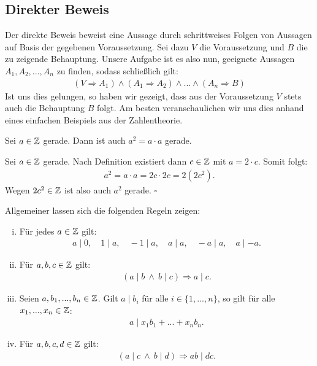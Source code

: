 \subsection{Direkter Beweis}
Der direkte Beweis beweist eine Aussage durch schrittweises Folgen von Aussagen auf Basis der gegebenen Voraussetzung. 
Sei dazu $V$ die Voraussetzung und $B$ die zu zeigende Behauptung. Unsere Aufgabe ist es also nun, geeignete Aussagen $A_1, A_2,...,A_n$ zu finden, 
sodass schließlich gilt: 
\begin{align*}
    (V \Rightarrow A_1) \wedge (A_1 \Rightarrow A_2) \wedge ... \wedge (A_n \Rightarrow B)
\end{align*}
Ist uns dies gelungen, so haben wir gezeigt, dass aus der Voraussetzung $V$ stets auch die Behauptung $B$ folgt. 
Am besten veranschaulichen wir uns dies anhand eines einfachen Beispiels aus der Zahlentheorie. 
\begin{proposition}
    Sei $a \in \mathbb{Z}$ gerade. Dann ist auch $a^2 = a \cdot a$ gerade. 
\end{proposition}


\begin{proof*}
    Sei $a \in \mathbb{Z}$ gerade. Nach Definition existiert dann $c \in \mathbb{Z}$ mit $a = 2 \cdot c$. Somit folgt: 
    \begin{align*}
        a^2 = a \cdot a = 2c \cdot 2c = 2(2c^2).
    \end{align*}
    Wegen $2c^2 \in \mathbb{Z}$ ist also auch $a^2$ gerade. 
    \hfill $\square$
\end{proof*}

Allgemeiner lassen sich die folgenden Regeln zeigen:

\begin{theorem}
    \begin{enumerate}[(i)]
        \item 
        Für jedes $a \in \mathbb{Z}$ gilt: 
        \begin{align*}
            a \mid 0, \quad 1 \mid a, \quad -1 \mid a,  \quad a \mid a, \quad -a \mid a, \quad a \mid -a . 
        \end{align*}
        \item 
        Für $a,b,c \in \mathbb{Z}$ gilt: 
        \begin{align*}
            (a \mid b \ \wedge \ b \mid c) \Rightarrow a \mid c . 
        \end{align*}
        \item 
        Seien $a,b_1,...,b_n \in \mathbb{Z}$. Gilt $a \mid b_i$ für alle $i \in \{1,...,n\}$, so gilt für alle $x_1,...,x_n \in \mathbb{Z}$: 
        \begin{align*}
            a \mid x_1 b_1 + ... + x_n b_n .
        \end{align*}
        \item 
        Für $a,b,c,d \in \mathbb{Z}$ gilt: 
        \begin{align*}
            (a \mid c \ \wedge  \ b \mid d) \Rightarrow ab \mid dc . 
        \end{align*}
    \end{enumerate}
\end{theorem}

